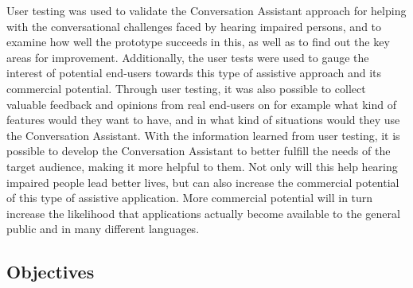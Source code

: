\documentclass[english, 12pt, a4paper, pdftex, elec, utf8]{aaltothesis}
\begin{document}
User testing was used to validate the Conversation Assistant approach for helping with the conversational challenges faced by hearing impaired persons, and to examine how well the prototype succeeds in this, as well as to find out the key areas for improvement. Additionally, the user tests were used to gauge the interest of potential end-users towards this type of assistive approach and its commercial potential. Through user testing, it was also possible to collect valuable feedback and opinions from real end-users on for example what kind of features would they want to have, and in what kind of situations would they use the Conversation Assistant. With the information learned from user testing, it is possible to develop the Conversation Assistant to better fulfill the needs of the target audience, making it more helpful to them. Not only will this help hearing impaired people lead better lives, but can also increase the commercial potential of this type of assistive application. More commercial potential will in turn increase the likelihood that applications actually become available to the general public and in many different languages.

\subsection{Objectives}
\end{document}
